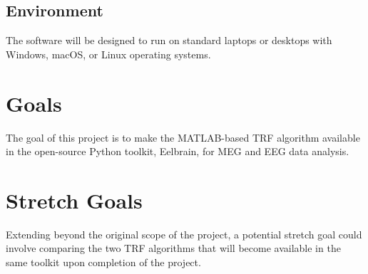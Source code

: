 \documentclass{article}
\begin{document}
\subsection{Environment}
The software will be designed to run on standard laptops or desktops with Windows, macOS, or Linux operating systems.

\section{Goals}
The goal of this project is to make the MATLAB-based TRF algorithm available in the open-source Python toolkit, Eelbrain, for MEG and EEG data analysis.
\section{Stretch Goals}
Extending beyond the original scope of the project, a potential stretch goal could involve comparing the two TRF algorithms that will become available in the same toolkit upon completion of the project.
\newpage{}
\end{document}
